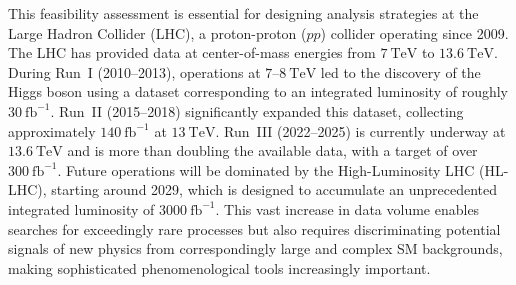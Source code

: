 This feasibility assessment is essential for designing analysis strategies at the Large Hadron Collider (LHC), a proton-proton ($pp$) collider operating since 2009. The LHC has provided data at center-of-mass energies from $7~\mathrm{TeV}$ to $13.6~\mathrm{TeV}$. During Run~I (2010–2013), operations at $7$–$8~\mathrm{TeV}$ led to the discovery of the Higgs boson using a dataset corresponding to an integrated luminosity of roughly $30~\mathrm{fb}^{-1}$. Run~II (2015–2018) significantly expanded this dataset, collecting approximately $140~\mathrm{fb}^{-1}$ at $13~\mathrm{TeV}$. Run~III (2022–2025) is currently underway at $13.6~\mathrm{TeV}$ and is more than doubling the available data, with a target of over $300~\mathrm{fb}^{-1}$. Future operations will be dominated by the High-Luminosity LHC (HL-LHC), starting around 2029, which is designed to accumulate an unprecedented integrated luminosity of $3000~\mathrm{fb}^{-1}$. This vast increase in data volume enables searches for exceedingly rare processes but also requires discriminating potential signals of new physics from correspondingly large and complex SM backgrounds, making sophisticated phenomenological tools increasingly important.

 
 
 
 
 

